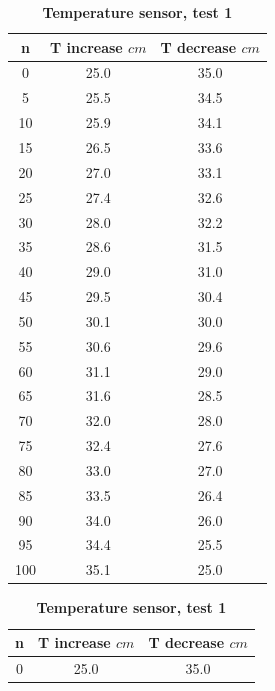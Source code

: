 \documentclass[12pt,a4paper,UTF8]{article}
\begin{document}
    \begin{table}[ht]
		\begin{minipage}{0.5\textwidth}
            \centering
            \begin{tabular}{ccc}
                \toprule
                n & T increase $cm$ & T decrease $cm$ \\
                \midrule               
                0 & 25.0 & 35.0 \\
                5 & 25.5 & 34.5 \\
                10 & 25.9 & 34.1 \\
                15 & 26.5 & 33.6 \\
                20 & 27.0 & 33.1 \\
                25 & 27.4 & 32.6 \\
                30 & 28.0 & 32.2 \\
                35 & 28.6 & 31.5 \\
                40 & 29.0 & 31.0 \\
                45 & 29.5 & 30.4 \\
                50 & 30.1 & 30.0 \\
                55 & 30.6 & 29.6 \\
                60 & 31.1 & 29.0 \\
                65 & 31.6 & 28.5 \\
                70 & 32.0 & 28.0 \\
                75 & 32.4 & 27.6 \\
                80 & 33.0 & 27.0 \\
                85 & 33.5 & 26.4 \\
                90 & 34.0 & 26.0 \\
                95 & 34.4 & 25.5 \\
                100 & 35.1 & 25.0 \\
                \bottomrule
            \end{tabular}
            \caption{\textbf{Temperature sensor, test 1}}
            \label{tab.2.2.1}
		\end{minipage}
		\begin{minipage}{0.5\textwidth}
            \centering
            \begin{tabular}{ccc}
                \toprule
                n & T increase $cm$ & T decrease $cm$ \\
                \midrule               
                0 & 25.0 & 35.0 \\

\end{tabular}
\end{minipage}
\end{table}
\end{document}
